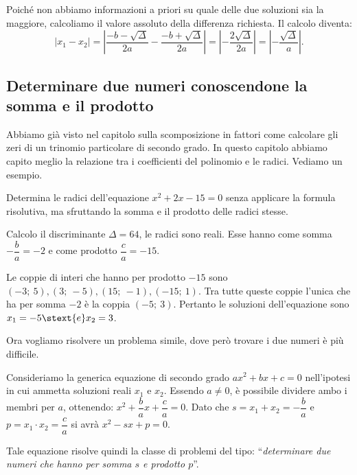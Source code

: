Poiché non abbiamo informazioni a priori su quale delle due soluzioni sia la 
maggiore, calcoliamo il valore assoluto della differenza richiesta. Il 
calcolo diventa: 
\[
\left\lvert x_1 -x_2 \right\rvert = \left\lvert \dfrac{-b 
-\sqrt{\Delta}}{2 
a} -\dfrac{-b +\sqrt{\Delta}}{2 a} \right\rvert =\left\lvert -\dfrac{2 
\sqrt{\Delta}}{2 a} \right\rvert = \left\lvert -\dfrac{\sqrt{\Delta}}{a} 
\right\rvert.
\]

\subsection{Determinare due numeri conoscendone la somma e il prodotto}

Abbiamo già visto nel capitolo sulla scomposizione in fattori come calcolare 
gli zeri di un trinomio particolare di secondo grado. In questo capitolo 
abbiamo capito meglio la relazione tra i coefficienti del polinomio e le 
radici. 
Vediamo un esempio.
\begin{esempio}
Determina le radici dell'equazione \(x^2 +2 x -15 = 0\) senza applicare la 
formula risolutiva, ma sfruttando la somma e il prodotto delle radici stesse.

Calcolo il discriminante \(\Delta = 64\), le radici sono reali. Esse hanno come 
somma~\(-\dfrac{b}{a} = -2\) e come prodotto \(\dfrac{c}{a} = -15\).

Le coppie di interi che hanno per prodotto \(-15\) sono \((-3;~5),(3;~-5), 
(15;~-1),(-15;~1)\). Tra tutte queste coppie l'unica che ha per somma \(-2\) 
è la coppia \((-5;~3)\).
Pertanto le soluzioni dell'equazione sono \(x_1 = -5 \stext{e} x_2 = 3\).
\end{esempio}

Ora vogliamo risolvere un problema simile, dove però trovare i due numeri 
è più difficile.

Consideriamo la generica equazione di secondo grado \(a x^2 +bx +c = 0\) 
nell'ipotesi in cui ammetta soluzioni reali \(x_1\) e \(x_2\). 
Essendo \(a \neq 0\), è possibile dividere ambo i membri per \(a\), 
ottenendo: 
\(x^2 + \dfrac{b}{a} x +\dfrac{c}{a} = 0\). 
Dato che \(s = x_1 +x_2 = -\dfrac{b}{a}\) \quad e \quad 
\(p = x_1 \cdot x_2 = \dfrac{c}{a}\) si avrà \(x^2 -s x +p = 0\).

Tale equazione risolve quindi la classe di problemi del tipo: 
``\emph{determinare due numeri che hanno per somma \(s\) e prodotto \(p\)}''.

